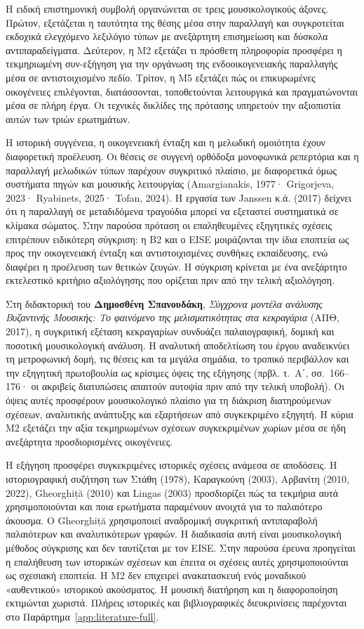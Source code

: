 \documentclass[11pt,a4paper]{article}
\begin{document}
Η ειδική επιστημονική συμβολή οργανώνεται σε τρεις μουσικολογικούς άξονες. Πρώτον, εξετάζεται η ταυτότητα της θέσης μέσα στην παραλλαγή και συγκροτείται εκδοχικά ελεγχόμενο λεξιλόγιο τύπων με ανεξάρτητη επισημείωση και δύσκολα αντιπαραδείγματα. Δεύτερον, η M2 εξετάζει τι πρόσθετη πληροφορία προσφέρει η τεκμηριωμένη συν-εξήγηση για την οργάνωση της ενδοοικογενειακής παραλλαγής μέσα σε αντιστοιχισμένο πεδίο. Τρίτον, η M5 εξετάζει πώς οι επικυρωμένες οικογένειες επιλέγονται, διατάσσονται, τοποθετούνται λειτουργικά και πραγματώνονται μέσα σε πλήρη έργα. Οι τεχνικές δικλίδες της πρότασης υπηρετούν την αξιοπιστία αυτών των τριών ερωτημάτων.

Η ιστορική συγγένεια, η οικογενειακή ένταξη και η μελωδική ομοιότητα έχουν διαφορετική προέλευση. Οι θέσεις σε συγγενή ορθόδοξα μονοφωνικά ρεπερτόρια και η παραλλαγή μελωδικών τύπων παρέχουν συγκριτικό πλαίσιο, με διαφορετικά όμως συστήματα πηγών και μουσικής λειτουργίας (Amargianakis, 1977· Grigorjeva, 2023· Ryabinets, 2025· Tofan, 2024). Η εργασία των Janssen κ.ά. (2017) δείχνει ότι η παραλλαγή σε μεταδιδόμενα τραγούδια μπορεί να εξεταστεί συστηματικά σε κλίμακα σώματος. Στην παρούσα πρόταση οι επαληθευμένες εξηγητικές σχέσεις επιτρέπουν ειδικότερη σύγκριση: η B2 και ο EISE μοιράζονται την ίδια εποπτεία ως προς την οικογενειακή ένταξη και αντιστοιχισμένες συνθήκες εκπαίδευσης, ενώ διαφέρει η προέλευση των θετικών ζευγών. Η σύγκριση κρίνεται με ένα ανεξάρτητο εκτελεστικό κριτήριο αξιολόγησης που ορίζεται πριν από την τελική αξιολόγηση.

Στη διδακτορική του \textbf{Δημοσθένη Σπανουδάκη}, \emph{Σύγχρονα μοντέλα ανάλυσης Βυζαντινής Μουσικής: Το φαινόμενο της μελισματικότητας στα κεκραγάρια} (ΑΠΘ, 2017), η συγκριτική εξέταση κεκραγαρίων συνδυάζει παλαιογραφική, δομική και ποσοτική μουσικολογική ανάλυση. Η αναλυτική αποδελτίωση του έργου αναδεικνύει τη μετροφωνική δομή, τις θέσεις και τα μεγάλα σημάδια, το τροπικό περιβάλλον και την εξηγητική πρωτοβουλία ως κρίσιμες όψεις της εξήγησης (πρβλ. τ.~Α΄, σσ.~166--176· οι ακριβείς διατυπώσεις απαιτούν αυτοψία πριν από την τελική υποβολή). Οι όψεις αυτές προσφέρουν μουσικολογικό πλαίσιο για τη διάκριση διατηρούμενων σχέσεων, αναλυτικής ανάπτυξης και εξαρτήσεων από συγκεκριμένο εξηγητή. Η κύρια M2 εξετάζει την αξία τεκμηριωμένων σχέσεων συγκεκριμένων χωρίων μέσα σε ήδη ανεξάρτητα προσδιορισμένες οικογένειες.

Η εξήγηση προσφέρει συγκεκριμένες ιστορικές σχέσεις ανάμεσα σε αποδόσεις. Η ιστοριογραφική συζήτηση των Στάθη (1978), Καραγκούνη (2003), Αρβανίτη (2010, 2022), Gheorghiță (2010) και Lingas (2003) προσδιορίζει πώς τα τεκμήρια αυτά χρησιμοποιούνται και ποια ερωτήματα παραμένουν ανοιχτά για το παλαιότερο άκουσμα. Ο Gheorghiță χρησιμοποιεί αναδρομική συγκριτική αντιπαραβολή παλαιότερων και αναλυτικότερων γραφών. Η διαδικασία αυτή είναι μουσικολογική μέθοδος σύγκρισης και δεν ταυτίζεται με τον EISE. Στην παρούσα έρευνα προηγείται η επαλήθευση των ιστορικών σχέσεων και έπειτα οι σχέσεις αυτές χρησιμοποιούνται ως σχεσιακή εποπτεία. Η M2 δεν επιχειρεί ανακατασκευή ενός μοναδικού «αυθεντικού» ιστορικού ακούσματος. Η μουσική διατήρηση και η διαφοροποίηση εκτιμώνται χωριστά. Πλήρεις ιστορικές και βιβλιογραφικές διευκρινίσεις παρέχονται στο Παράρτημα~\ref{app:literature-full}.
\end{document}
